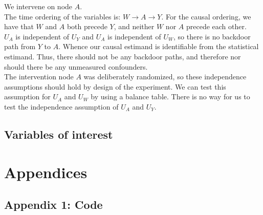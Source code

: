 \documentclass[oneside, notitlepage]{book}
\begin{document}
We intervene on node $A$.\\

The time ordering of the variables is: $W \to A \to Y$. For the causal ordering, we have that $W$ and $A$ both precede $Y$, and neither $W$ nor $A$ precede each other.\\
                          
$U_A$ is independent of $U_Y$ and $U_A$ is independent of $U_W$, so there is no backdoor path from $Y$ to $A$. Whence our causal estimand is identifiable from the statistical estimand. Thus, there should not be any backdoor paths, and therefore nor should there be any unmeasured confounders.\\

The intervention node $A$ was deliberately randomized, so these independence assumptions should hold by design of the experiment. We can test this assumption for $U_A$ and $U_W$ by using a balance table. There is no way for us to test the independence assumption of $U_A$ and $U_Y$.\\




\section{Variables of interest}
\label{sec:variables-interest}




\printbibliography


\chapter{Appendices}
\label{cha:appendices}

\section{Appendix 1: Code}
\label{sec:appendix-1}

















\end{document}

